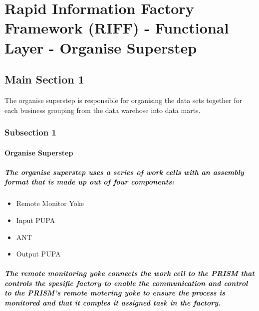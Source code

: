 
\chapter{Rapid Information Factory Framework (RIFF) - Functional Layer - Organise Superstep} %

\label{Chapter15} %



\section{Main Section 1}

The organise superstep is responsible for organising the data sets together for each business grouping from the data warehose into data marts.

\subsection{Subsection 1}

\subsubsection{Organise Superstep}
\paragraph{The organise superstep uses a series of work cells with an assembly format that is made up out of four components:}
\begin{itemize}
\item{Remote Monitor Yoke}
\item{Input PUPA}
\item{ANT}
\item{Output PUPA}
\end{itemize}
\paragraph{The remote monitoring yoke connects the work cell to the PRISM that controls the spesific factory to enable the communication and control to the PRISM's remote motering yoke to ensure the process is monitored and that it comples it assigned task in the factory.}
